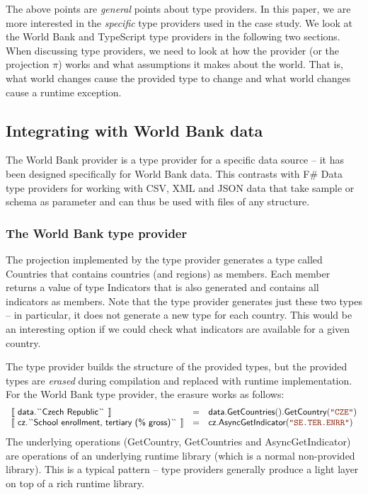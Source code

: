 \documentclass[submission,copyright,creativecommons]{eptcs}
\newcommand{\sem}[1]{\llbracket #1 \rrbracket}
\newcommand{\str}[1]{\textnormal{\textcolor{strclr}{\ttfamily "#1"}}}
\newcommand{\ident}[1]{\textnormal{\sffamily #1}}
\newcommand{\lident}[1]{\textnormal{\sffamily 
  \`{}\hspace{-0.25em}\`{}\hspace{-0.1em}#1\`{}\hspace{-0.25em}\`{}}}
\begin{document}
\noindent
The above points are \emph{general} points about type providers. In this paper, we are more interested
in the \emph{specific} type providers used in the case study. We look at the World Bank and TypeScript
type providers in the following two sections. When discussing type providers, we need to look at 
how the provider (or the projection $\pi$) works and what assumptions it makes about the world. 
That is, what world changes cause the provided type to change and what world changes cause a 
runtime exception. 


\subsection{Integrating with World Bank data}
\label{sec:tp-data}

The World Bank provider \cite{fsharp-data} is a type provider for a specific data source -- it has 
been designed specifically for World Bank data. This contrasts with F\# Data type providers for 
working with CSV, XML and JSON data that take sample or schema as parameter and can thus be used 
with files of any structure.

\subsubsection{The World Bank type provider}

The projection implemented by the type provider generates a type called \ident{Countries} that contains 
countries (and regions) as members. Each member returns a value of type \ident{Indicators} that is
also generated and contains all indicators as members. Note that the type provider generates just 
these two types -- in particular, it does not generate a new type for each country. This would be an 
interesting option if we could check what indicators are available for a given country.

The type provider builds the structure of the provided types, but the provided types are \emph{erased} 
during compilation and replaced with runtime implementation. For the World Bank type provider, the 
erasure works as follows:
%
\begin{equation*}
\begin{array}{lcl}
 \sem{~\ident{data.}\lident{Czech Republic}~} &=&
   \ident{data.GetCountries}().\ident{GetCountry}(\str{CZE}) \\
 \sem{~\ident{cz.}\lident{School enrollment, tertiary (\% gross)}~} &=&
   \ident{cz.AsyncGetIndicator}(\str{SE.TER.ENRR})
\end{array}
\end{equation*}
%
The underlying operations (\ident{GetCountry}, \ident{GetCountries} and \ident{AsyncGetIndicator})
are operations of an underlying runtime library (which is a normal non-provided library). This is
a typical pattern -- type providers generally produce a light layer on top of a rich runtime library.
\end{document}
